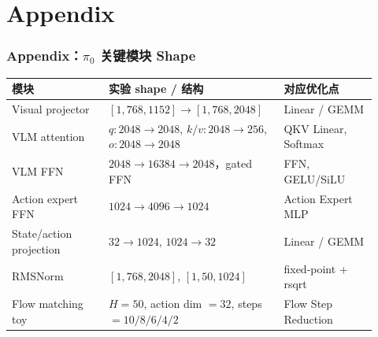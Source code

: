 \documentclass[10pt, aspectratio=169]{beamer}
\newcommand{\piZero}{\texorpdfstring{$\pi_0$}{pi0}\xspace}
\begin{document}
\appendix
\section{Appendix}

\begin{frame}
  \frametitle{Appendix：\piZero 关键模块 Shape}
  \scriptsize
  \begin{table}
    \setlength{\tabcolsep}{2pt}
    \begin{tabular}{@{}p{0.25\linewidth}p{0.43\linewidth}p{0.24\linewidth}@{}}
      \toprule
      模块                      & 实验 shape / 结构                                                              & 对应优化点               \\
      \midrule
      Visual projector        & $[1,768,1152] \rightarrow [1,768,2048]$                                    & Linear / GEMM       \\
      VLM attention           & $q:2048\rightarrow2048$, $k/v:2048\rightarrow256$, $o:2048\rightarrow2048$ & QKV Linear, Softmax \\
      VLM FFN                 & $2048 \rightarrow 16384 \rightarrow 2048$，gated FFN                        & FFN, GELU/SiLU      \\
      Action expert FFN       & $1024 \rightarrow 4096 \rightarrow 1024$                                   & Action Expert MLP   \\
      State/action projection & $32\rightarrow1024$, $1024\rightarrow32$                                   & Linear / GEMM       \\
      RMSNorm                 & $[1,768,2048]$, $[1,50,1024]$                                              & fixed-point + rsqrt \\
      Flow matching toy       & $H=50$, action dim $=32$, steps $=10/8/6/4/2$                              & Flow Step Reduction \\
      \bottomrule
    \end{tabular}
  \end{table}
\end{frame}
\end{document}
